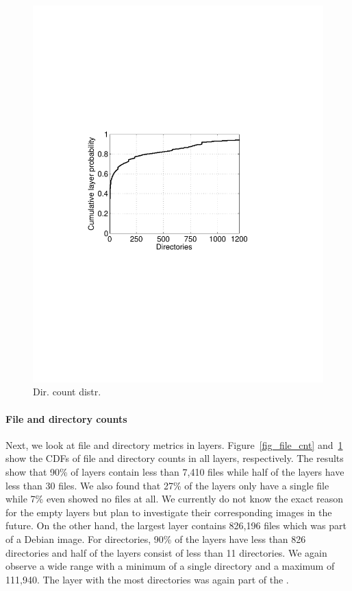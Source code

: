 \begin{figure}
\begin{minipage}{0.23\textwidth}
		\includegraphics[width=1\textwidth]{graphs/dir_cnt.pdf}
		\caption{Dir. count distr.
		}
		\label{fig_dir_cnt}
	\end{minipage}%
\end{figure}
%

\paragraph{File and directory counts}

Next, we look at file and directory metrics in layers.
Figure~\ref{fig_file_cnt} and~\ref{fig_dir_cnt} show the CDFs of file
and directory counts in all layers, respectively.
%
The results show that 90\% of layers contain less than 7,410 files while half
of the layers have less than 30 files.
%
We also found that 27\% of the layers only have a single file while 7\% even showed
no files at all. We currently do not know the exact reason for the empty layers but
plan to investigate their corresponding images in the future. On the other hand,
the largest layer contains 826,196 files which was part of a Debian image.
%
%
For directories, 90\% of the layers have less than 826 directories and half of the layers consist
of less than 11 directories. We again observe a wide range with a minimum of a single directory
and a maximum of 111,940. The layer with the most directories was again part of the
.

